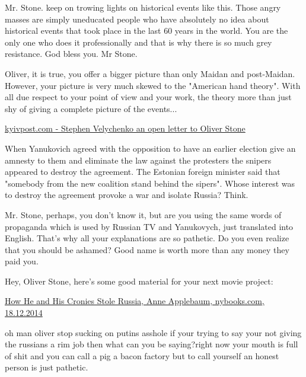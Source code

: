 \begin{itemize}

Mr. Stone. keep on trowing lights on historical events like this. Those angry
masses are simply uneducated people who have absolutely no idea about
historical events that took place in the last 60 years in the world. You are
the only one who does it professionally and that is why there is so much grey
resistance. God bless you. Mr Stone.


Oliver, it is true, you offer a bigger picture than only Maidan and
post-Maidan. However, your picture is very much skewed to the "American hand
theory". With all due respect to your point of view and your work, the theory
more than just shy of giving a complete picture of the events...


\href{https://www.kyivpost.com/opinion/letters/stephen-velychenko-an-open-letter-to-oliver-stone-376557.html}{%
kyivpost.com - Stephen Velychenko an open letter to Oliver Stone%
}


When Yanukovich agreed with the opposition to have an earlier election give an
amnesty to them and eliminate the law against the protesters the snipers
appeared to destroy the agreement. The Estonian foreign minister said that
"somebody from the new coalition stand behind the sipers". Whose interest was
to destroy the agreement provoke a war and isolate Russia? Think.



Mr. Stone, perhaps, you don't know it, but are you using the same words of
propaganda which is used by Russian TV and Yanukovych, just translated into
English. That's why all your explanations are so pathetic. Do you even realize
that you should be ashamed? Good name is worth more than any money they paid
you.


Hey, Oliver Stone, here's some good material for your next movie project: 

\href{https://www.nybooks.com/articles/2014/12/18/how-he-and-his-cronies-stole-russia/}{%
How He and His Cronies Stole Russia, Anne Applebaum, nybooks.com, 18.12.2014%
}


oh man oliver stop sucking on putins asshole if your trying to say your not
giving the russians a rim job then what can you be saying?right now your mouth
is full of shit and you can call a pig a bacon factory but to call yourself an
honest person is just pathetic.



\end{itemize}
